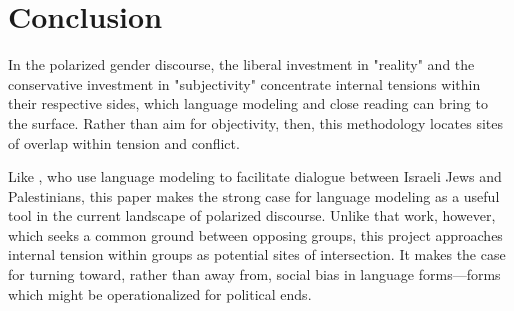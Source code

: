 \documentclass{article}
\begin{document}
\section{Conclusion}
In the polarized gender discourse, the liberal investment in "reality" and the conservative investment in "subjectivity" concentrate internal tensions within their respective sides, which language modeling and close reading can bring to the surface. Rather than aim for objectivity, then, this methodology locates sites of overlap within tension and conflict. 

Like \citet{konya_2025}, who use language modeling to facilitate dialogue between Israeli Jews and Palestinians, this paper makes the strong case for language modeling as a useful tool in the current landscape of polarized discourse. Unlike that work, however, which seeks a common ground between opposing groups, this project approaches internal tension within groups as potential sites of intersection. It makes the case for turning toward, rather than away from, social bias in language forms---forms which might be operationalized for political ends. 


\begin{ack}

\end{ack}





\appendix



\newpage

\end{document}

